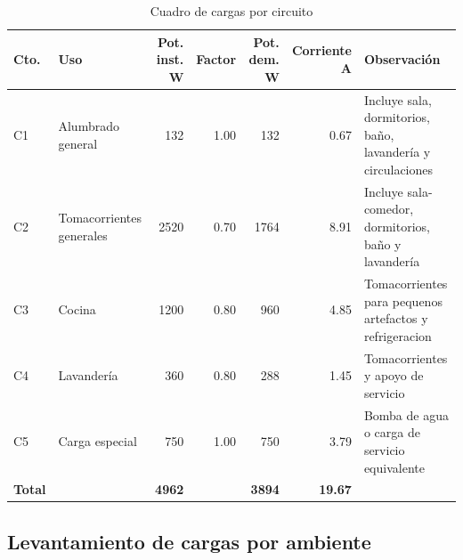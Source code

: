 \begin{landscape}
\begin{table}[H]
\centering
\scriptsize
\setlength{\tabcolsep}{4pt}
\caption{Cuadro de cargas por circuito}
\label{tab:cuadro-cargas-circuito}
\begin{tabularx}{\textwidth}{L{1.0cm}L{2.2cm}r r r r Y}
\toprule
\textbf{Cto.} & \textbf{Uso} & \textbf{Pot. inst. W} & \textbf{Factor} & \textbf{Pot. dem. W} & \textbf{Corriente A} & \textbf{Observación} \\
\midrule
C1 & Alumbrado general & 132 & 1.00 & 132 & 0.67 & Incluye sala, dormitorios, baño, lavandería y circulaciones \\
C2 & Tomacorrientes generales & 2520 & 0.70 & 1764 & 8.91 & Incluye sala-comedor, dormitorios, baño y lavandería \\
C3 & Cocina & 1200 & 0.80 & 960 & 4.85 & Tomacorrientes para pequenos artefactos y refrigeracion \\
C4 & Lavandería & 360 & 0.80 & 288 & 1.45 & Tomacorrientes y apoyo de servicio \\
C5 & Carga especial & 750 & 1.00 & 750 & 3.79 & Bomba de agua o carga de servicio equivalente \\
\textbf{Total} &  & \textbf{4962} &  & \textbf{3894} & \textbf{19.67} &  \\
\bottomrule
\end{tabularx}
\end{table}
\end{landscape}

\subsection{Levantamiento de cargas por ambiente}

